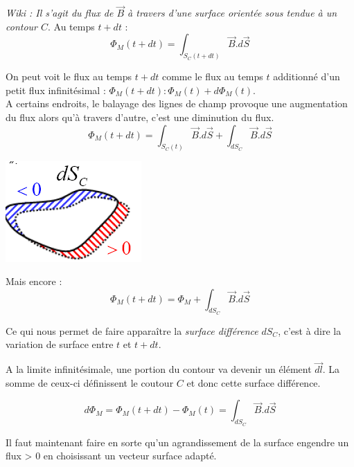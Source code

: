 \documentclass	[11pt, a4paper, openany]{book}
\begin{document}
\textit{Wiki : Il s'agit du flux de $\vec{B}$ à travers d'une surface orientée sous tendue à un contour $C$}.
Au temps $t+dt$ :
\begin{equation}
\Phi_M(t+dt)= \int_{S_C(t+dt)} \vec{B}.d\vec{S}
\end{equation}

On peut voit le flux au temps $t+dt$ comme le flux au temps $t$ additionné d'un petit flux infinitésimal : $\Phi_M(t+dt) : \Phi_M(t) + d\Phi_M(t)$.\\

A certains endroits, le balayage des lignes de champ provoque une augmentation du flux alors qu'à travers d'autre, c'est une diminution du flux. 
\begin{equation}
\Phi_M(t+dt) = \int_{S_C(t)} \vec{B}.d\vec{S} + \int_{dS_C} \vec{B}.d\vec{S}
\end{equation}

\begin{center}
\includegraphics[scale=0.45]{em/image29.png}\\
\end{center}
Mais encore : 
\begin{equation}
\Phi_M(t+dt) = \Phi_M + \int_{dS_C} \vec{B}.d\vec{S}
\end{equation}


Ce qui nous permet de faire apparaître la \textit{surface différence} $dS_C$, c'est à dire la variation de surface entre $t$ et $t+dt$.

A la limite infinitésimale, une portion du contour va devenir un élément $\vec{dl}$. La somme de ceux-ci définissent le coutour $C$ et donc cette surface différence.

\begin{equation}
d\Phi_M = \Phi_M(t+dt) - \Phi_M(t) = \int_{dS_C} \vec{B}.d\vec{S}
\end{equation}

Il faut maintenant faire en sorte qu'un agrandissement de la surface engendre un flux > 0 en choisissant un vecteur surface adapté.\\
\end{document}
